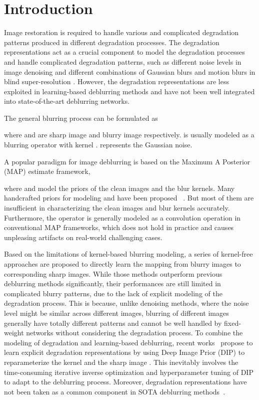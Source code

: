 \documentclass[runningheads]{llncs}
\begin{document}
\section{Introduction}
\label{sec:intro}
Image restoration is required to handle various and complicated degradation patterns produced in different degradation processes. The degradation representations act as a crucial component to model the degradation processes and handle complicated degradation patterns, such as different noise levels in image denoising \cite{zhang2018ffdnet,Guo2019Cbdnet,MildenhallKPN18} and different combinations of Gaussian blurs and motion blurs in blind super-resolution \cite{unsupervised_degradation}. 
However, the degradation representations are less exploited in learning-based deblurring methods and have not been well integrated into state-of-the-art deblurring networks.

The general blurring process can be formulated as

where  and  are sharp image and blurry image respectively.   is usually modeled as a blurring operator with kernel .  represents the Gaussian noise.

A popular paradigm for image deblurring is based on the Maximum A Posterior (MAP) estimate framework,

where  and  model the priors of the clean images and the blur kernels. 
Many handcrafted priors for modeling  and  have been proposed ~\cite{blind_dark_channel,blind_spectral,hyper_laplacian,total_variation}. But most of them are insufficient in characterizing the clean images and blur kernels accurately. 
Furthermore, the operator  is generally modeled as a convolution operation in conventional MAP frameworks, which does not hold in practice and causes unpleasing artifacts on real-world challenging cases.

Based on the limitations of kernel-based blurring modeling, a series of kernel-free approaches \cite{gao2019dynamic,tao2018srndeblur,HINet,Zamir2021MPRNet,MIMO_UNet} are proposed to directly learn the mapping from blurry images to corresponding sharp images. While those methods outperform previous deblurring methods significantly, their performances are still limited in complicated blurry patterns, due to the lack of explicit modeling of the degradation process. This is because, unlike denoising methods, where the noise level might be similar across different images, blurring of different images generally have totally different patterns and cannot be well handled by fixed-weight networks without considering the degradation process.
To combine the modeling of degradation and learning-based deblurring, recent works~\cite{Exploring_blur-CVPR21,Blind_DIP} propose to learn explicit degradation representations by using Deep Image Prior (DIP) \cite{DIP_2018_CVPR} to reparameterize the kernel  and the sharp image .
This inevitably involves the time-consuming iterative inverse optimization and hyperparameter tuning of DIP to adapt to the deblurring process.
Moreover, degradation representations have not been taken as a common component in SOTA deblurring methods~\cite{HINet,Zamir2021MPRNet}.
\end{document}
